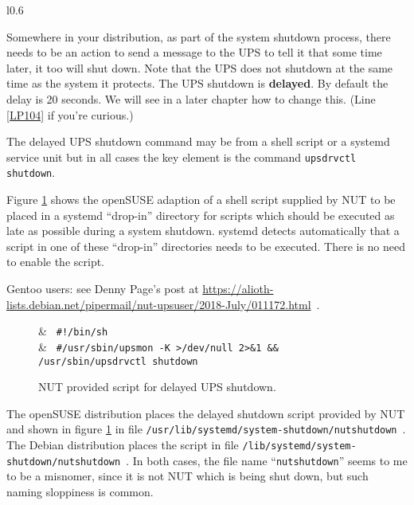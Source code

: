 \documentclass[12pt]{article}
\newcommand{\Ref}[1]{\ref{#1}}
\begin{document}
\begin{wrapfigure}{l}{0.6\LinePrinterwidth}
\vspace{-6mm}
\begin{center}
\end{center}
\vspace{-6mm}
\caption{Delayed UPS shutdown.\label{fig:delayedUPSshutdown}}
\end{wrapfigure}
%
Somewhere in your distribution, as part of the system shutdown process, there
needs to be an action to send a message to the UPS to tell it that some time
later, it too will shut down.  Note that the UPS does not shutdown at the same
time as the system it protects.  The UPS shutdown is \textbf{delayed}.  By
default the delay is 20 seconds.  We will see in a later chapter how to change
this. (Line \Ref{LP104} if you're curious.)

The delayed UPS shutdown command may be from a shell script or a
systemd service unit but in all cases the key element is the command
\texttt{upsdrvctl shutdown}.

Figure \ref{fig:delayedUPSshutdownscript} shows the openSUSE adaption of a
shell script supplied by NUT to be placed in a systemd ``drop-in'' directory
for scripts which should be executed as late as possible during a system
shutdown.  systemd detects automatically that a script in one of these
``drop-in'' directories needs to be executed. There is no need to enable the
script.

Gentoo users: see Denny Page's post at
\href{https://alioth-lists.debian.net/pipermail/nut-upsuser/2018-July/011172.html}%
     {https://alioth-lists{\allowbreak}.debian.net/{\allowbreak}pipermail/nut-upsuser{\allowbreak}/2018-July/{\allowbreak}011172.html}\ .

       \begin{figure}[ht]
\begin{LinePrinter}[0.97\LinePrinterwidth]
\Clunk         & \verb` #!/bin/sh` \\
\Clunk         & \verb` #/usr/sbin/upsmon -K >/dev/null 2>&1 && /usr/sbin/upsdrvctl shutdown` \\
\end{LinePrinter}
\vspace{-6mm}
\caption{NUT provided script for delayed UPS shutdown.\label{fig:delayedUPSshutdownscript}}
\end{figure}

The openSUSE distribution places the delayed shutdown script provided by NUT
and shown in figure \ref{fig:delayedUPSshutdownscript} in file
\texttt{/usr{\allowbreak}/lib{\allowbreak}/systemd{\allowbreak}/system-shutdown{\allowbreak}/nutshutdown}\ .
The Debian distribution places the script in file
\texttt{/lib{\allowbreak}/systemd{\allowbreak}/system-shutdown{\allowbreak}/nutshutdown}\ .
In both cases, the file name ``\texttt{nutshutdown}'' seems to me to be a
misnomer, since it is not NUT which is being shut down, but such naming
sloppiness is common.
\end{document}
